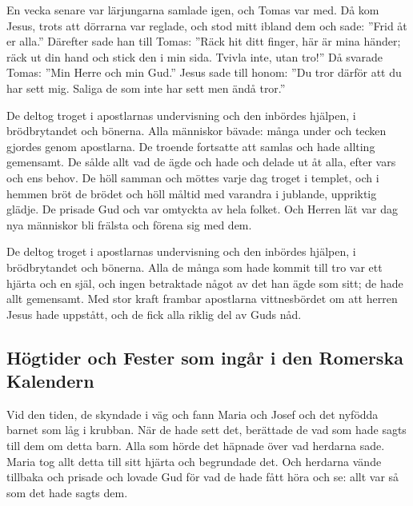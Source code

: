 \newpage
{}

En vecka senare var lärjungarna samlade igen, och Tomas var med. Då kom Jesus, trots att dörrarna var reglade, och stod mitt ibland dem och sade: ”Frid åt er alla.” 
Därefter sade han till Tomas: ”Räck hit ditt finger, här är mina händer; räck ut din hand och stick den i min sida. Tvivla inte, utan tro!” Då svarade Tomas: ”Min Herre och min Gud.” Jesus sade till honom: ”Du tror därför att du har sett mig. Saliga de som inte har sett men ändå tror.”



De deltog troget i apostlarnas undervisning och den inbördes hjälpen, i brödbrytandet och bönerna. Alla människor bävade: många under och tecken gjordes genom apostlarna. De troende fortsatte att samlas och hade allting gemensamt. De sålde allt vad de ägde och hade och delade ut åt alla, efter vars och ens behov. De höll samman och möttes varje dag troget i templet, och i hemmen bröt de brödet och höll måltid med varandra i jublande, uppriktig glädje. De prisade Gud och var omtyckta av hela folket. Och Herren lät var dag nya människor bli frälsta och förena sig med dem.



De deltog troget i apostlarnas undervisning och den inbördes hjälpen, i brödbrytandet och bönerna. Alla de många som hade kommit till tro var ett hjärta och en själ, och ingen betraktade något av det han ägde som sitt; de hade allt gemensamt. Med stor kraft frambar apostlarna vittnesbördet om att herren Jesus hade uppstått, och de fick alla riklig del av Guds nåd.


\newpage
\subsection{Högtider och Fester som ingår i den Romerska Kalendern}





Vid den tiden, de skyndade i väg och fann Maria och Josef och det nyfödda barnet som låg i krubban. 
När de hade sett det, berättade de vad som hade sagts till dem om detta barn. 
Alla som hörde det häpnade över vad herdarna sade. 
Maria tog allt detta till sitt hjärta och begrundade det. 
Och herdarna vände tillbaka och prisade och lovade Gud för vad de hade fått höra och se: allt var så som det hade sagts dem.

